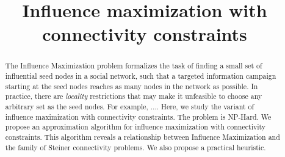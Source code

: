 \documentclass[11pt]{article}
\title{Influence maximization with connectivity constraints}
\author{}
\date{}
\begin{document}
\maketitle
%
\begin{abstract}
The Influence Maximization problem formalizes the task of finding a small set of influential seed nodes in a social network, such that a targeted information campaign starting at the seed nodes reaches as many nodes in the network as possible. In practice, there are \emph{locality} restrictions that may make it unfeasible to choose any arbitrary set as the seed nodes. For example, $\ldots$. Here, we study the variant of influence maximization with connectivity constraints. The problem is NP-Hard. We propose an approximation algorithm for influence maximization with connectivity constraints. This algorithm reveals a relationship between Influence Maximization and the family of Steiner connectivity problems. We also propose a practical heuristic.
\end{abstract}










\end{document}

